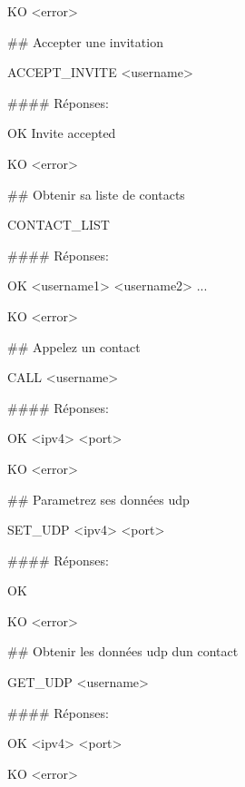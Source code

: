 \begin{DoxyCode}
KO <error>
\end{DoxyCode}


\#\# Accepter une invitation 
\begin{DoxyCode}
ACCEPT\_INVITE <username>
\end{DoxyCode}
 \#\#\#\# Réponses\+: 
\begin{DoxyCode}
OK Invite accepted
\end{DoxyCode}
 
\begin{DoxyCode}
KO <error>
\end{DoxyCode}


\#\# Obtenir sa liste de contacts 
\begin{DoxyCode}
CONTACT\_LIST
\end{DoxyCode}
 \#\#\#\# Réponses\+: 
\begin{DoxyCode}
OK <username1> <username2> ...
\end{DoxyCode}
 
\begin{DoxyCode}
KO <error>
\end{DoxyCode}


\#\# Appelez un contact 
\begin{DoxyCode}
CALL <username>
\end{DoxyCode}
 \#\#\#\# Réponses\+: 
\begin{DoxyCode}
OK <ipv4> <port>
\end{DoxyCode}
 
\begin{DoxyCode}
KO <error>
\end{DoxyCode}


\#\# Parametrez ses données udp 
\begin{DoxyCode}
SET\_UDP <ipv4> <port>
\end{DoxyCode}
 \#\#\#\# Réponses\+: 
\begin{DoxyCode}
OK
\end{DoxyCode}
 
\begin{DoxyCode}
KO <error>
\end{DoxyCode}


\#\# Obtenir les données udp d\textquotesingle{}un contact 
\begin{DoxyCode}
GET\_UDP <username>
\end{DoxyCode}
 \#\#\#\# Réponses\+: 
\begin{DoxyCode}
OK <ipv4> <port>
\end{DoxyCode}
 
\begin{DoxyCode}
KO <error>
\end{DoxyCode}
 
